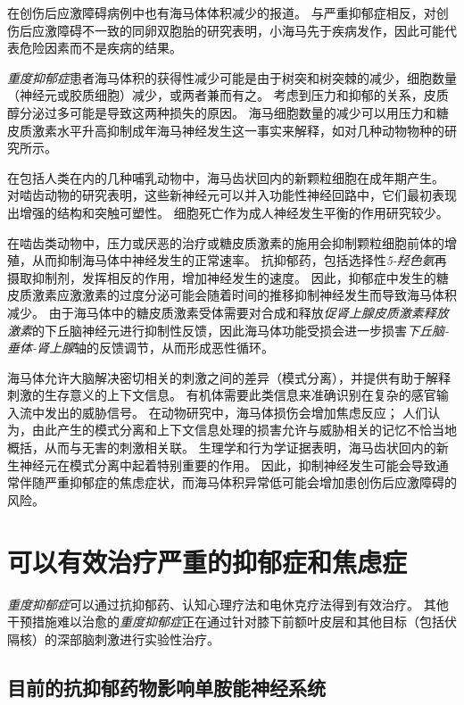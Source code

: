 在创伤后应激障碍病例中也有海马体体积减少的报道。
与严重抑郁症相反，对创伤后应激障碍不一致的同卵双胞胎的研究表明，小海马先于疾病发作，因此可能代表危险因素而不是疾病的结果。


\textit{重度抑郁症}患者海马体积的获得性减少可能是由于树突和树突棘的减少，细胞数量（神经元或胶质细胞）减少，或两者兼而有之。
考虑到压力和抑郁的关系，皮质醇分泌过多可能是导致这两种损失的原因。
海马细胞数量的减少可以用压力和糖皮质激素水平升高抑制成年海马神经发生这一事实来解释，如对几种动物物种的研究所示。


在包括人类在内的几种哺乳动物中，海马齿状回内的新颗粒细胞在成年期产生。
对啮齿动物的研究表明，这些新神经元可以并入功能性神经回路中，它们最初表现出增强的结构和突触可塑性。
细胞死亡作为成人神经发生平衡的作用研究较少。


在啮齿类动物中，压力或厌恶的治疗或糖皮质激素的施用会抑制颗粒细胞前体的增殖，从而抑制海马体中神经发生的正常速率。
抗抑郁药，包括选择性\textit{5-羟色氨}再摄取抑制剂，发挥相反的作用，增加神经发生的速度。
因此，抑郁症中发生的糖皮质激素应激激素的过度分泌可能会随着时间的推移抑制神经发生而导致海马体积减少。
由于海马体中的糖皮质激素受体需要对合成和释放\textit{促肾上腺皮质激素释放激素}的下丘脑神经元进行抑制性反馈，因此海马体功能受损会进一步损害\textit{下丘脑-垂体-肾上腺}轴的反馈调节，从而形成恶性循环。


海马体允许大脑解决密切相关的刺激之间的差异（模式分离），并提供有助于解释刺激的生存意义的上下文信息。
有机体需要此类信息来准确识别在复杂的感官输入流中发出的威胁信号。
在动物研究中，海马体损伤会增加焦虑反应；
人们认为，由此产生的模式分离和上下文信息处理的损害允许与威胁相关的记忆不恰当地概括，从而与无害的刺激相关联。
生理学和行为学证据表明，海马齿状回内的新生神经元在模式分离中起着特别重要的作用。
因此，抑制神经发生可能会导致通常伴随严重抑郁症的焦虑症状，而海马体积异常低可能会增加患创伤后应激障碍的风险。



\section{可以有效治疗严重的抑郁症和焦虑症}

\textit{重度抑郁症}可以通过抗抑郁药、认知心理疗法和电休克疗法得到有效治疗。
其他干预措施难以治愈的\textit{重度抑郁症}正在通过针对膝下前额叶皮层和其他目标（包括伏隔核）的深部脑刺激进行实验性治疗。



\subsection{目前的抗抑郁药物影响单胺能神经系统}

